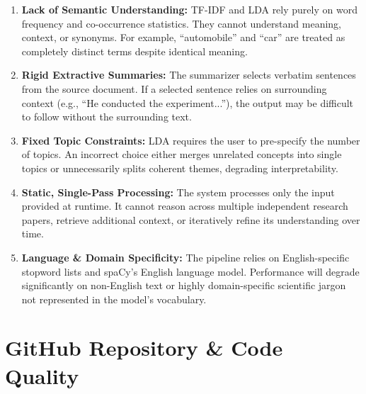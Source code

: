 \documentclass[12pt, a4paper]{article}
\begin{document}
\begin{enumerate}
  \item \textbf{Lack of Semantic Understanding:} TF-IDF and LDA rely purely on word frequency and co-occurrence statistics. They cannot understand meaning, context, or synonyms. For example, ``automobile'' and ``car'' are treated as completely distinct terms despite identical meaning.

  \item \textbf{Rigid Extractive Summaries:} The summarizer selects verbatim sentences from the source document. If a selected sentence relies on surrounding context (e.g., ``He conducted the experiment...''), the output may be difficult to follow without the surrounding text.

  \item \textbf{Fixed Topic Constraints:} LDA requires the user to pre-specify the number of topics. An incorrect choice either merges unrelated concepts into single topics or unnecessarily splits coherent themes, degrading interpretability.

  \item \textbf{Static, Single-Pass Processing:} The system processes only the input provided at runtime. It cannot reason across multiple independent research papers, retrieve additional context, or iteratively refine its understanding over time.

  \item \textbf{Language \& Domain Specificity:} The pipeline relies on English-specific stopword lists and spaCy's English language model. Performance will degrade significantly on non-English text or highly domain-specific scientific jargon not represented in the model's vocabulary.
\end{enumerate}

\section{GitHub Repository \& Code Quality}
\end{document}
